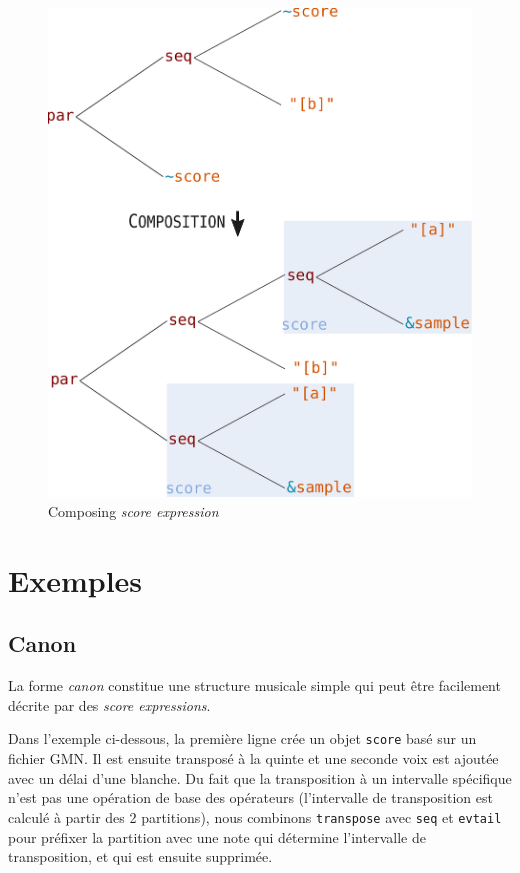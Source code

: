 \documentclass{article}
\newcommand{\OSC}[1]	{{\fontsize{10pt}{10pt} \selectfont\texttt{#1}}}
\newcommand{\sExpr}{\emph{score expression}}
\newcommand{\sExprs}{\emph{score expressions}}
\begin{document}
\begin{figure}[th]
\centering
\includegraphics[width=0.9\columnwidth]{imgs/expandingTree}
\caption{Composing \sExpr
\label{fig:expandingTree}}
\end{figure}

\section{Exemples}
\label{examples}

\subsection{Canon}

La forme \emph{canon} constitue une structure musicale simple qui peut être facilement décrite par des \sExprs.

Dans l'exemple ci-dessous, la première ligne crée un objet \OSC{score} basé sur un fichier GMN. Il est ensuite transposé à la quinte et une seconde voix est ajoutée avec un délai d'une blanche. Du fait que la transposition à un intervalle spécifique n'est pas une opération de base des opérateurs (l'intervalle de transposition est calculé à partir des 2 partitions), nous combinons \OSC{transpose} avec \OSC{seq} et \OSC{evtail} pour préfixer la partition avec une note qui détermine l'intervalle de transposition, et qui est ensuite supprimée.
\end{document}
